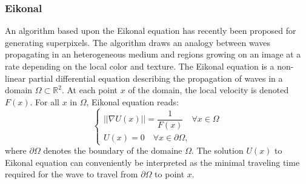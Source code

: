 \documentclass{article}
\begin{document}
        \subsubsection{Eikonal}

            An algorithm based upon the Eikonal equation has recently been proposed for generating superpixels. The algorithm draws an analogy between waves propagating in an heterogeneous medium and regions growing on an image at a rate depending on the local color and texture.
            The Eikonal equation is a non-linear partial differential equation describing the propagation of waves in a domain $\Omega \subset \mathbb{R}^2$. At each point $x$ of the domain, the local velocity is denoted $F(x)$. For all $x$ in $\Omega $, Eikonal equation reads:
            \begin{equation}
              \begin{cases}
                ||\nabla U(x)|| = \dfrac{1}{F(x)} \quad \forall x \in \Omega \\
                U(x) = 0    \quad \forall x \in \partial \Omega,
              \end{cases}
            \end{equation}
            where $\partial \Omega $ denotes the boundary of the domaine $\Omega $. The solution $U(x)$ to Eikonal equation can conveniently be interpreted as the minimal traveling time required for the wave to travel from $\partial \Omega$ to point $x$.
\end{document}
